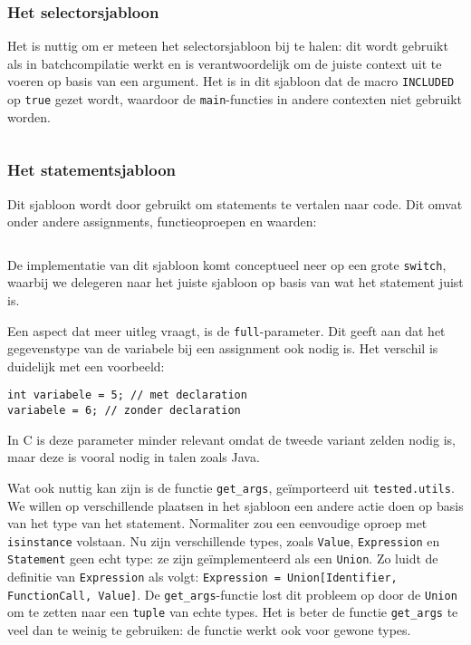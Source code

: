 \inputminted[firstline=65,lastline=69]{mako}{sources/c-context.mako}

\subsubsection{Het selectorsjabloon}

Het is nuttig om er meteen het selectorsjabloon bij te halen: dit wordt gebruikt als \tested{} in batchcompilatie werkt en is verantwoordelijk om de juiste context uit te voeren op basis van een argument.
Het is in dit sjabloon dat de macro \texttt{INCLUDED} op \texttt{true} gezet wordt, waardoor de \texttt{main}-functies in andere contexten niet gebruikt worden.

\inputminted{mako}{sources/c-selector.mako}

\subsubsection{Het statementsjabloon}

Dit sjabloon wordt door \tested{} gebruikt om statements te vertalen naar code.
Dit omvat onder andere assignments, functieoproepen en waarden:

\inputminted{mako}{sources/c-statement.mako}

De implementatie van dit sjabloon komt conceptueel neer op een grote \texttt{switch}, waarbij we delegeren naar het juiste sjabloon op basis van wat het statement juist is.

Een aspect dat meer uitleg vraagt, is de \texttt{full}-parameter.
Dit geeft aan dat het gegevenstype van de variabele bij een assignment ook nodig is.
Het verschil is duidelijk met een voorbeeld:

\begin{verbatim}
int variabele = 5; // met declaration
variabele = 6; // zonder declaration
\end{verbatim}

In C is deze parameter minder relevant omdat de tweede variant zelden nodig is, maar deze is vooral nodig in talen zoals Java.

Wat ook nuttig kan zijn is de functie \texttt{get\_args}, geïmporteerd uit \texttt{tested.utils}.
We willen op verschillende plaatsen in het sjabloon een andere actie doen op basis van het type van het statement.
Normaliter zou een eenvoudige oproep met \texttt{isinstance} volstaan.
Nu zijn verschillende types, zoals \texttt{Value}, \texttt{Expression} en \texttt{Statement} geen echt type: ze zijn geïmplementeerd als een \texttt{Union}.
Zo luidt de definitie van \texttt{Expression} als volgt: \texttt{Expression = Union[Identifier, FunctionCall, Value]}.
De \texttt{get\_args}-functie lost dit probleem op door de \texttt{Union} om te zetten naar een \texttt{tuple} van echte types.
Het is beter de functie \texttt{get\_args} te veel dan te weinig te gebruiken: de functie werkt ook voor gewone types.

